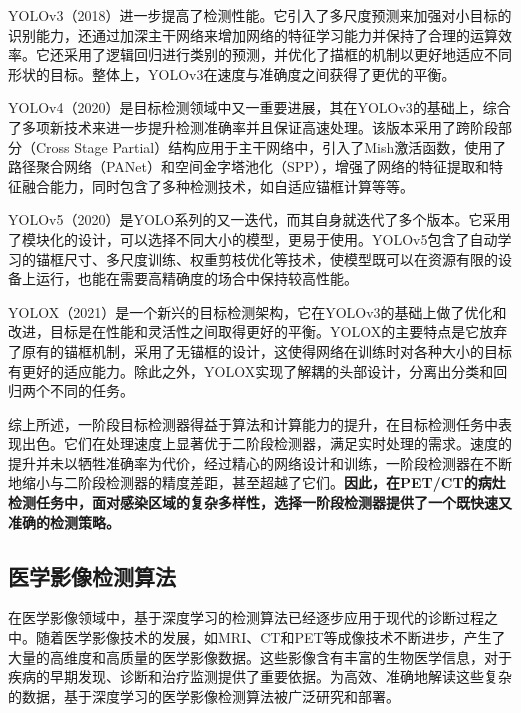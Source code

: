 YOLOv3\cite{redmon2018yolov3}（2018）进一步提高了检测性能。它引入了多尺度预测来加强对小目标的识别能力，还通过加深主干网络来增加网络的特征学习能力并保持了合理的运算效率。它还采用了逻辑回归进行类别的预测，并优化了描框的机制以更好地适应不同形状的目标。整体上，YOLOv3在速度与准确度之间获得了更优的平衡。

YOLOv4\cite{bochkovskiy2020yolov4}（2020）是目标检测领域中又一重要进展，其在YOLOv3\cite{redmon2018yolov3}的基础上，综合了多项新技术来进一步提升检测准确率并且保证高速处理。该版本采用了跨阶段部分（Cross Stage Partial）\cite{wang2020cspnet}结构应用于主干网络中，引入了Mish\cite{misra2019mish}激活函数，使用了路径聚合网络（PANet）\cite{liu2018path}和空间金字塔池化（SPP）\cite{he2015spatial}，增强了网络的特征提取和特征融合能力，同时包含了多种检测技术，如自适应锚框计算等等。

YOLOv5\cite{jocher2020yolov5}（2020）是YOLO系列的又一迭代，而其自身就迭代了多个版本。它采用了模块化的设计，可以选择不同大小的模型，更易于使用。YOLOv5包含了自动学习的锚框尺寸、多尺度训练、权重剪枝优化等技术，使模型既可以在资源有限的设备上运行，也能在需要高精确度的场合中保持较高性能。

YOLOX\cite{ge2021yolox}（2021）是一个新兴的目标检测架构，它在YOLOv3的基础上做了优化和改进，目标是在性能和灵活性之间取得更好的平衡。YOLOX的主要特点是它放弃了原有的锚框机制，采用了无锚框的设计，这使得网络在训练时对各种大小的目标有更好的适应能力。除此之外，YOLOX实现了解耦的头部设计，分离出分类和回归两个不同的任务。

综上所述，一阶段目标检测器得益于算法和计算能力的提升，在目标检测任务中表现出色。它们在处理速度上显著优于二阶段检测器，满足实时处理的需求。速度的提升并未以牺牲准确率为代价，经过精心的网络设计和训练，一阶段检测器在不断地缩小与二阶段检测器的精度差距，甚至超越了它们。\textbf{因此，在PET/CT的病灶检测任务中，面对感染区域的复杂多样性，选择一阶段检测器提供了一个既快速又准确的检测策略。}

\subsection{医学影像检测算法}

在医学影像领域中，基于深度学习的检测算法已经逐步应用于现代的诊断过程之中。随着医学影像技术的发展，如MRI、CT和PET等成像技术不断进步，产生了大量的高维度和高质量的医学影像数据。这些影像含有丰富的生物医学信息，对于疾病的早期发现、诊断和治疗监测提供了重要依据。为高效、准确地解读这些复杂的数据，基于深度学习的医学影像检测算法被广泛研究和部署。

